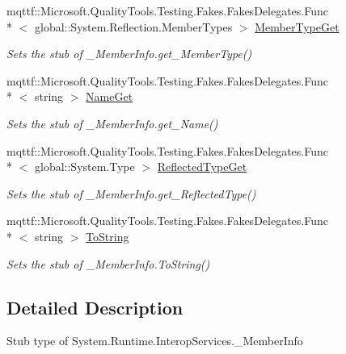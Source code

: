 \begin{DoxyCompactItemize}
mqttf\-::\-Microsoft.\-Quality\-Tools.\-Testing.\-Fakes.\-Fakes\-Delegates.\-Func\\*
$<$ global\-::\-System.\-Reflection.\-Member\-Types $>$ \hyperlink{class_system_1_1_runtime_1_1_interop_services_1_1_fakes_1_1_stub___member_info_ad815d1fdff20c555c0597468e3d0d39a}{Member\-Type\-Get}
\begin{DoxyCompactList}\small\item\em Sets the stub of \-\_\-\-Member\-Info.\-get\-\_\-\-Member\-Type()\end{DoxyCompactList}\item 
mqttf\-::\-Microsoft.\-Quality\-Tools.\-Testing.\-Fakes.\-Fakes\-Delegates.\-Func\\*
$<$ string $>$ \hyperlink{class_system_1_1_runtime_1_1_interop_services_1_1_fakes_1_1_stub___member_info_ac36acd9a47173d2f9c747331b4c8e1d8}{Name\-Get}
\begin{DoxyCompactList}\small\item\em Sets the stub of \-\_\-\-Member\-Info.\-get\-\_\-\-Name()\end{DoxyCompactList}\item 
mqttf\-::\-Microsoft.\-Quality\-Tools.\-Testing.\-Fakes.\-Fakes\-Delegates.\-Func\\*
$<$ global\-::\-System.\-Type $>$ \hyperlink{class_system_1_1_runtime_1_1_interop_services_1_1_fakes_1_1_stub___member_info_a3e0c1050a266991d26ed59f18cc70673}{Reflected\-Type\-Get}
\begin{DoxyCompactList}\small\item\em Sets the stub of \-\_\-\-Member\-Info.\-get\-\_\-\-Reflected\-Type()\end{DoxyCompactList}\item 
mqttf\-::\-Microsoft.\-Quality\-Tools.\-Testing.\-Fakes.\-Fakes\-Delegates.\-Func\\*
$<$ string $>$ \hyperlink{class_system_1_1_runtime_1_1_interop_services_1_1_fakes_1_1_stub___member_info_a590202ae401500308dd406357b7edaa5}{To\-String}
\begin{DoxyCompactList}\small\item\em Sets the stub of \-\_\-\-Member\-Info.\-To\-String()\end{DoxyCompactList}\end{DoxyCompactItemize}


\subsection{Detailed Description}
Stub type of System.\-Runtime.\-Interop\-Services.\-\_\-\-Member\-Info



